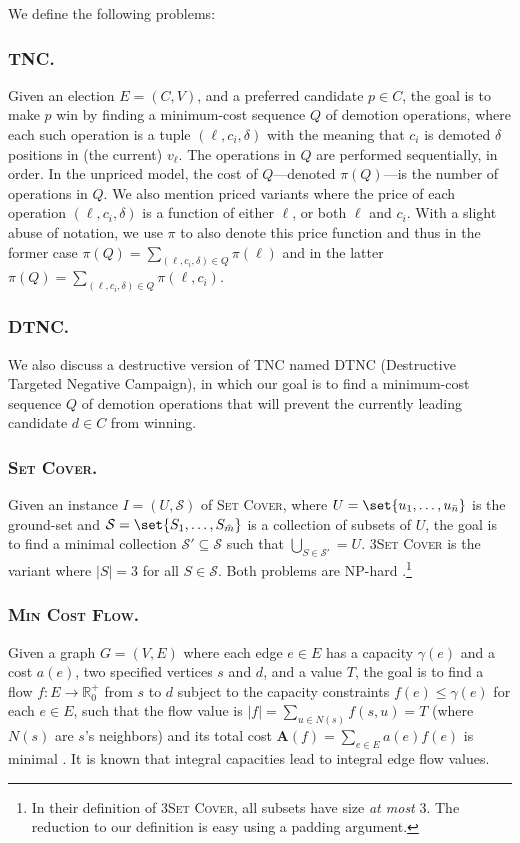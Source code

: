 \documentclass[letterpaper]{article} %
\newcommand{\preals}{\mathbb{R}^{+}_{0}}
\newcommand{\vecc}{\mathbf}
\newcommand{\CTSC}{\textsc{3Set Cover}}
\newcommand{\SC}{\textsc{Set Cover}}
\newcommand{\MCF}{\textsc{Min Cost Flow}}
\newcommand{\SB}{\textsc{TNC}}
\newcommand{\DTNC}{\textsc{DTNC}}
\newcommand{\abs}[1]{\lvert{#1}\rvert}
\newcommand{\Aoper}[1]{\vecc{A}({#1})}
\newcommand{\NP}{\mathrm{NP}}
\begin{document}
We define the following problems:
\subsubsection{\SB{}.} Given an election $E=(C,V)$, and a preferred candidate $p \in C$, the goal is to make $p$ win by finding a minimum-cost sequence $Q$ of demotion operations, where each such operation is a tuple $(\ell, c_i, \delta)$ with the meaning that $c_i$ is demoted $\delta$ positions in (the current) $v_\ell$. The operations in $Q$ are performed sequentially, in order. In the unpriced model, the cost of $Q$---denoted $\pi(Q)$---is the number of operations in $Q$. We also mention priced variants where the price of each operation $(\ell, c_i, \delta)$  is a function of either $\ell$, or both $\ell$ and $c_i$. With a slight abuse of notation, we use $\pi$ to also denote this price function and thus  in the former case $\pi(Q)=\sum_{(\ell, c_i, \delta) \in Q}\pi(\ell)$ and in the latter  $\pi(Q)=\sum_{(\ell, c_i, \delta) \in Q}\pi(\ell, c_i)$.

\subsubsection{\DTNC{}.} %
We also discuss a destructive version of \SB{} named \DTNC{} (Destructive Targeted Negative Campaign), in which our goal is to find a minimum-cost sequence $Q$ of demotion operations that will prevent the currently leading candidate $d \in C$ from winning.

\subsubsection{\SC{}.} Given an instance $I=(U,\mathcal{S})$ of \SC,  where $U=\set{u_1,\ldots,u_{\bar{n}}}$ is the ground-set and $\mathcal{S}=\set{S_1,\ldots,S_{\bar{m}}}$ is a collection of subsets of $U$,  the  goal is to find a minimal collection $\mathcal{S}' \subseteq \mathcal{S}$ such that $\bigcup_{S \in \mathcal{S}'} = U$. \CTSC{} is the variant where $\abs{S} = 3$ for all $S \in \mathcal{S}$. Both problems are $\NP$-hard \cite{garey1979computers}.\footnote{In their definition of \CTSC{}, all subsets have size \emph{at most} $3$. The reduction to our definition is easy using a padding argument.}
\subsubsection{\MCF{}.} Given a graph $G=(V,E)$ where each edge $e \in E$ has  a capacity $\gamma(e)$ and a cost $a(e)$, two specified vertices $s$ and $d$, and a value $T$, the goal is to find a flow $f\colon E \to \preals$ from $s$ to $d$ subject to the capacity constraints $f(e) \leq \gamma(e)$ for each $e \in E$, such that the flow value is $\abs{f} =\sum_{u \in  N(s)}f(s,u) = T$ (where $N(s)$ are $s$'s neighbors) and its total cost $\Aoper{f} = \sum_{e \in E}a(e)f(e)$ is minimal \cite{edmonds1972theoretical}. It is known that integral capacities lead to integral  edge flow values. 
\end{document}
